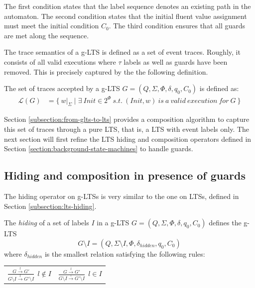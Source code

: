 The first condition states that the label sequence denotes an existing path in the automaton. The second condition states that the initial fluent value assignment must meet the initial condition $C_0$. The third condition ensures that all guards are met along the sequence.

The trace semantics of a g-LTS is defined as a set of event traces. Roughly, it consists of all valid executions where $\tau$ labels as well as guards have been removed. This is precisely captured by the the following definition.

\begin{definition}
The set of traces accepted by a g-LTS $G = (Q,\Sigma,\Phi,\delta,q_{0},C_{0})$ is defined as:
\begin{align*}
\mathcal{L}(G) &= \{~w|_{\Sigma} \mid \exists~Init \in 2^\Phi~s.t.~(Init,w)~is~a~valid~execution~for~G~\}
\end{align*}
\end{definition}

Section \ref{subsection:from-glts-to-lts} provides a composition algorithm to capture this set of traces through a pure LTS, that is, a LTS with event labels only. The next section will first refine the LTS hiding and composition operators defined in Section \ref{section:background-state-machines} to handle guards.

\subsection{Hiding and composition in presence of guards}

The hiding operator on g-LTSs is very similar to the one on LTSs, defined in Section \ref{subsection:lts-hiding}. 

\begin{definition}
The \emph{hiding} of a set of labels $I$ in a g-LTS $G = (Q,\Sigma,\Phi,\delta,q_{0},C_{0})$ defines the g-LTS
\begin{equation*}
G \setminus I = (Q,\Sigma \setminus I,\Phi,\delta_{hidden},q_{0},C_0)
\end{equation*}
\noindent where $\delta_{hidden}$ is the smallest relation satisfying the following rules:
\begin{center}
\begin{tabular}{cc}
$\frac{\displaystyle G \stackrel{l}{\longrightarrow} G'}{\displaystyle G \setminus I \stackrel{l}{\longrightarrow} G' \setminus I}~~l \notin I$ & 
$\frac{\displaystyle G \stackrel{l}{\longrightarrow} G'}{\displaystyle G \setminus I \stackrel{\tau}{\longrightarrow} G' \setminus I}~~l \in I$ \\
\end{tabular}
\end{center}
\end{definition}

